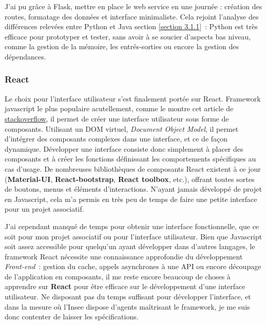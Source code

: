 J'ai pu grâce à Flask, mettre en place le web service en une journée : création des routes, formatage des données et interface minimaliste. Cela rejoint l'analyse des différences relevées entre Python et Java section \ref{section 3.1.1}~: Python est très efficace pour prototyper et tester, sans avoir à se soucier d'aspects bas niveau, comme la gestion de la mémoire, les entrés-sorties ou encore la gestion des dépendances.
\label{section 3.2.2 - Flask}

\subsubsection*{React}
Le choix pour l'interface utilisateur s'est finalement portée sur React. Framework javascript le plus populaire acutellement, comme le montre cet article de \href{https://stackoverflow.blog/2018/01/11/brutal-lifecycle-javascript-frameworks/}{stackoverflow}, il permet de créer une interface utilisateur sous forme de composants. Utilisant un DOM virtuel, \textit{Document Object Model}, il permet d'intégrer des composants complexes dans une interface, et ce de façon dynamique. Développer une interface consiste donc simplement à placer des composants et à créer les fonctions définissant les comportements spécifiques au cas d'usage. De nombreuses bibliothèques de composants React existent à ce jour (\textbf{Material-UI}, \textbf{React-bootstrap}, \textbf{React toolbox}, etc.), offrant toutes sortes de boutons, menus et éléments d'interactions. N'ayant jamais développé de projet en Javascript, cela m'a permis en très peu de temps de faire une petite interface pour un projet associatif.
\newline

J'ai cependant manqué de temps pour obtenir une interface fonctionnelle, que ce soit pour mon projet associatif ou pour l'interface utilisateur. Bien que Javascript soit assez accessible pour quelqu'un ayant développer dans d'autres langages, le framework React nécessite une connaissance approfondie du développement \textit{Front-end}~: gestion du cache, appels asynchrones à une API ou encore découpage de l'application en composants, il me reste encore beaucoup de choses à apprendre sur \textbf{React} pour être efficace sur le développement d'une interface utilisateur. Ne disposant pas du temps suffisant pour développer l'interface, et dans la mesure où l'Insee dispose d'agents maîtrisant le framework, je me suis donc contenter de laisser les spécifications.
\newline

